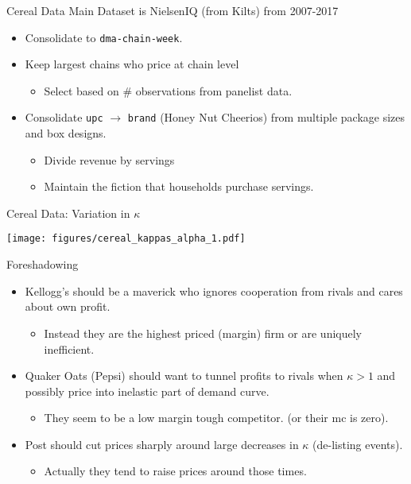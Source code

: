 \begin{frame}{Cereal Data}
Main Dataset is NielsenIQ (from Kilts) from 2007-2017
\begin{itemize}
\item Consolidate to \texttt{dma-chain-week}.
\item Keep largest chains who price at chain level
\begin{itemize}
\item Select based on \# observations from panelist data.
\end{itemize}    
\item Consolidate \texttt{upc} $\rightarrow$ \texttt{brand} (Honey Nut Cheerios) from multiple package sizes and box designs.
\begin{itemize}
\item Divide revenue by servings
\item Maintain the fiction that households purchase servings.
\end{itemize}
\end{itemize}
\end{frame}


\begin{frame}[plain]{Cereal Data: Variation in $\kappa$}
\begin{center}
\texttt{[image: figures/cereal\_kappas\_alpha\_1.pdf]}
\end{center}
\end{frame}


\begin{frame}{Foreshadowing}
\begin{itemize}
\item Kellogg's should be a \alert{maverick} who ignores cooperation from rivals and cares about own profit.
\begin{itemize}
\item Instead they are the highest priced (margin) firm or are uniquely inefficient.
\end{itemize}
\item Quaker Oats (Pepsi) should want to \alert{tunnel} profits to rivals when $\kappa > 1$ and possibly price into inelastic part of demand curve.
\begin{itemize}
\item They seem to be a low margin tough competitor. (or their mc is zero).
\end{itemize}
\item Post should \alert{cut prices} sharply around large decreases in $\kappa$ (de-listing events).
\begin{itemize}
\item Actually they tend to \alert{raise prices} around those times.
\end{itemize}
\end{itemize}
\end{frame}




